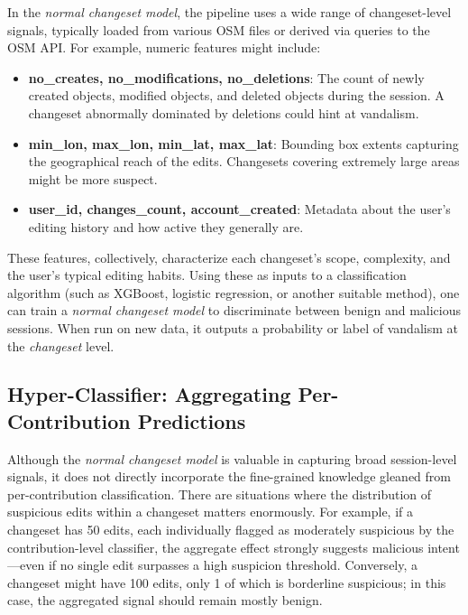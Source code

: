 \documentclass[
    13pt, %
    a4paper, %
    twoside, 
    DIV14, %
    listof=totoc, %
    bibliography=totoc, %
    index=totoc, %
    headsepline
]{scrreprt}
\begin{document}
In the \emph{normal changeset model}, the pipeline uses a wide range of changeset-level signals, typically loaded from various OSM files or derived via queries to the OSM API. For example, numeric features might include:
\begin{itemize}
    \item \textbf{no\_creates, no\_modifications, no\_deletions}: The count of newly created objects, modified objects, and deleted objects during the session. A changeset abnormally dominated by deletions could hint at vandalism.
    \item \textbf{min\_lon, max\_lon, min\_lat, max\_lat}: Bounding box extents capturing the geographical reach of the edits. Changesets covering extremely large areas might be more suspect.
    \item \textbf{user\_id, changes\_count, account\_created}: Metadata about the user’s editing history and how active they generally are.
\end{itemize}
These features, collectively, characterize each changeset’s scope, complexity, and the user’s typical editing habits. Using these as inputs to a classification algorithm (such as XGBoost, logistic regression, or another suitable method), one can train a \emph{normal changeset model} to discriminate between benign and malicious sessions. When run on new data, it outputs a probability or label of vandalism at the \textit{changeset} level.

\subsection{Hyper-Classifier: Aggregating Per-Contribution Predictions}
\label{sec:hyper_classifier}

Although the \emph{normal changeset model} is valuable in capturing broad session-level signals, it does not directly incorporate the fine-grained knowledge gleaned from per-contribution classification. There are situations where the distribution of suspicious edits within a changeset matters enormously. For example, if a changeset has 50 edits, each individually flagged as moderately suspicious by the contribution-level classifier, the aggregate effect strongly suggests malicious intent—even if no single edit surpasses a high suspicion threshold. Conversely, a changeset might have 100 edits, only 1 of which is borderline suspicious; in this case, the aggregated signal should remain mostly benign.
\end{document}
